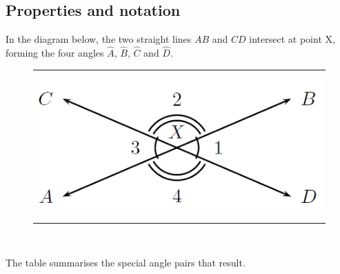\subsection*{Properties and notation}
\nopagebreak
In the diagram below, the two straight lines $AB$ and $CD$ intersect at point X, forming the four
angles $\hat{A}$, $\hat{B}$, $\hat{C}$ and $\hat{D}$.\par 
\setcounter{subfigure}{0}
\begin{figure}[H] %
\begin{center}
\rule[.1in]{\figurerulewidth}{.005in}
\label{m39370*uid27!!!underscore!!!media}\label{
m39370*uid27!!!underscore!!!printimage}\includegraphics[width=.5\columnwidth]{
col11306.imgs/m39370_MG10C13_009.png} %
\vspace{2pt}
\vspace{\rubberspace}\par 
\vspace{.1in}
\rule[.1in]{\figurerulewidth}{.005in} \\
\end{center}
\end{figure}       
The table summarises the special angle pairs that result.\par 
